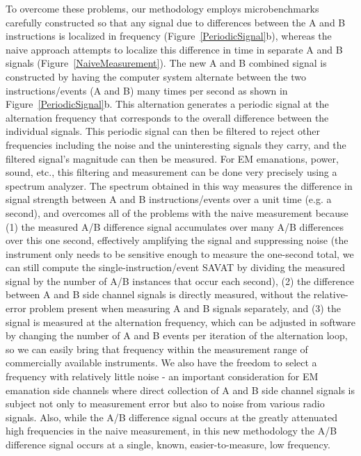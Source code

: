 To overcome these problems, our methodology employs microbenchmarks carefully constructed so that any signal due to differences between the A and B instructions is localized in frequency (Figure~\ref{PeriodicSignal}b), whereas the naive approach attempts to localize this difference in time in separate A and B signals (Figure~\ref{NaiveMeasurement}). The new A and B combined signal is constructed by having the computer system alternate between the two instructions/events (A and B) many times per second as shown in Figure~\ref{PeriodicSignal}b. This alternation generates a periodic signal at the alternation frequency that corresponds to the overall difference between the individual signals. This periodic signal can then be filtered to reject other frequencies including the noise and the uninteresting signals they carry, and the filtered signal's magnitude can then be measured. For EM emanations, power, sound, etc., this filtering and measurement can be done very precisely using a spectrum analyzer. The spectrum obtained in this way measures the difference in signal strength between A and B instructions/events over a unit time (e.g. a second), and overcomes all of the problems with the naive measurement because (1) the measured A/B difference signal accumulates over many A/B differences over this one second, effectively amplifying the signal and suppressing noise (the instrument only needs to be sensitive enough to measure the one-second total, we can still compute the single-instruction/event SAVAT by dividing the measured signal by the number of A/B instances that occur each second), (2) the difference between A and B side channel signals is directly measured, without the relative-error problem present when measuring A and B signals separately, and (3) the signal is measured at the alternation frequency, which can be adjusted in software by changing the number of A and B events per iteration of the alternation loop, so we can easily bring that frequency within the measurement range of commercially available instruments. We also have the freedom to select a frequency with relatively little noise - an important consideration for EM emanation side channels where direct collection of A and B side channel signals is subject not only to measurement error but also to noise from various radio signals. Also, while the A/B difference signal occurs at the greatly attenuated high frequencies in the naive measurement,  in this new methodology the A/B difference signal occurs at a single, known, easier-to-measure, low frequency. 

